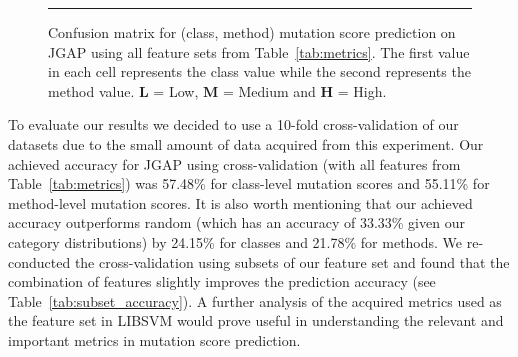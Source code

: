 \documentclass[conference]{IEEEtran}
\begin{document}
\begin{figure}[!t]
  \caption{Confusion matrix for (class, method) mutation score prediction on JGAP using all feature sets from Table~\ref{tab:metrics}. The first value in each cell represents the class value while the second represents the method value. \(\mathbf{L}\) = Low, \(\mathbf{M}\) = Medium and \(\mathbf{H}\) = High.}
  \label{fig:confusion_matrix}
  \vspace{2mm}
  \hrule
\end{figure}

To evaluate our results we decided to use a 10-fold cross-validation of our datasets due to the small amount of data acquired from this experiment. Our achieved accuracy for JGAP using cross-validation (with all features from Table~\ref{tab:metrics}) was 57.48\% for class-level mutation scores and 55.11\% for method-level mutation scores. It is also worth mentioning that our achieved accuracy outperforms random (which has an accuracy of 33.33\% given our category distributions) by 24.15\% for classes and 21.78\% for methods. We re-conducted the cross-validation using subsets of our feature set and found that the combination of features slightly improves the prediction accuracy (see Table~\ref{tab:subset_accuracy}). A further analysis of the acquired metrics used as the feature set in LIBSVM would prove useful in understanding the relevant and important metrics in mutation score prediction.
\end{document}
